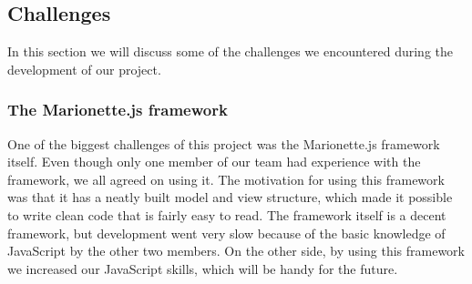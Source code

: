 \documentclass{article}
\begin{document}
\subsection{Challenges}

In this section we will discuss some of the challenges we encountered during the development of our project.

\subsubsection{The Marionette.js framework}
One of the biggest challenges of this project was the Marionette.js framework itself. Even though only one member of our team had experience with the framework, we all agreed on using it. The motivation for using this framework was that it has a neatly built model and view structure, which made it possible to write clean code that is fairly easy to read. The framework itself is a decent framework, but development went very slow because of the basic knowledge of JavaScript by the other two members. On the other side, by using this framework we increased our JavaScript skills, which will be handy for the future.
\end{document}
